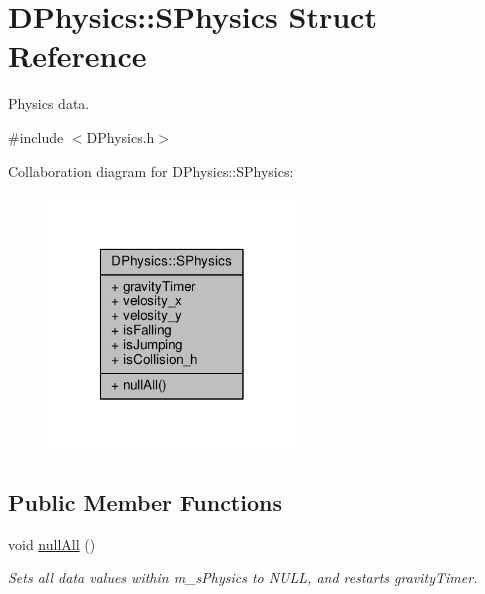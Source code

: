 \hypertarget{structDPhysics_1_1SPhysics}{\section{D\-Physics\-:\-:S\-Physics Struct Reference}
\label{structDPhysics_1_1SPhysics}
}


Physics data.  




{\ttfamily \#include $<$D\-Physics.\-h$>$}



Collaboration diagram for D\-Physics\-:\-:S\-Physics\-:
\nopagebreak
\begin{figure}[H]
\begin{center}
\leavevmode
\includegraphics[width=186pt]{structDPhysics_1_1SPhysics__coll__graph}
\end{center}
\end{figure}
\subsection*{Public Member Functions}
\begin{DoxyCompactItemize}
\item 
void \hyperlink{structDPhysics_1_1SPhysics_aa4cf9f9d5ae6ab52b53a76d7bc507e55}{null\-All} ()
\begin{DoxyCompactList}\small\item\em Sets all data values within m\-\_\-s\-Physics to N\-U\-L\-L, and restarts gravity\-Timer. \end{DoxyCompactList}\end{DoxyCompactItemize}
